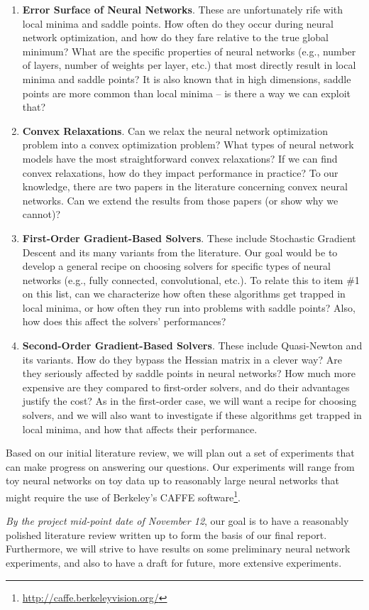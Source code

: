 \documentclass[10pt]{article}
\begin{document}
\begin{enumerate}
    \item \textbf{Error Surface of Neural Networks}. These are unfortunately rife with local minima
    and saddle points. How often do they occur during neural network optimization, and how do they
    fare relative to the true global minimum? What are the specific properties of neural networks
    (e.g., number of layers, number of weights per layer, etc.) that most directly result in local
    minima and saddle points? It is also known that in high dimensions, saddle points are more
    common than local minima -- is there a way we can exploit that?

    \item \textbf{Convex Relaxations}. Can we relax the neural network optimization problem into a
    convex optimization problem? What types of neural network models have the most straightforward
    convex relaxations?  If we can find convex relaxations, how do they impact performance in
    practice? To our knowledge, there are two papers in the literature concerning convex neural
    networks. Can we extend the results from those papers (or show why we cannot)?

    \item \textbf{First-Order Gradient-Based Solvers}. These include Stochastic Gradient Descent and
    its many variants from the literature. Our goal would be to develop a general recipe on choosing
    solvers for specific types of neural networks (e.g., fully connected, convolutional, etc.).  To
    relate this to item \#1 on this list, can we characterize how often these algorithms get trapped
    in local minima, or how often they run into problems with saddle points? Also, how does this affect the solvers' performances?

    \item \textbf{Second-Order Gradient-Based Solvers}. These include Quasi-Newton and its variants.
    How do they bypass the Hessian matrix in a clever way? Are they seriously affected by saddle
    points in neural networks? How much more expensive are they compared to first-order solvers,
    and do their advantages justify the cost?  As in the first-order case, we will want a recipe for
    choosing solvers, and we will also want to investigate if these algorithms get trapped in local
    minima, and how that affects their performance.
\end{enumerate}

Based on our initial literature review, we will plan out a set of experiments that can make progress
on answering our questions. Our experiments will range from toy neural networks on toy data up to
reasonably large neural networks that might require the use of Berkeley's CAFFE
software\footnote{\url{http://caffe.berkeleyvision.org/}}.

\emph{By the project mid-point date of November 12}, our goal is to have a reasonably polished
literature review written up to form the basis of our final report. Furthermore, we will strive to
have results on some preliminary neural network experiments, and also to have a draft for future,
more extensive experiments.
\end{document}
